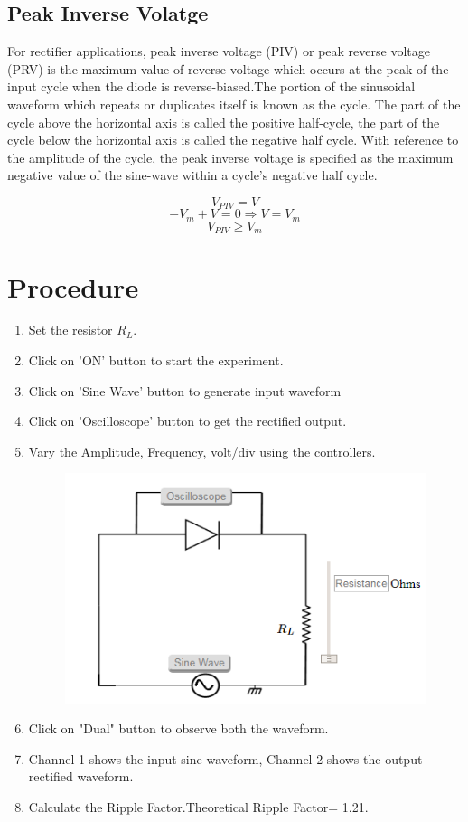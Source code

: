 		\subsection{Peak Inverse Volatge}
			For rectifier applications, peak inverse voltage (PIV) or peak reverse voltage (PRV) is the maximum value of reverse voltage which occurs at the peak of the input cycle when the diode is reverse-biased.The portion of the sinusoidal waveform which repeats or duplicates itself is known as the cycle. The part of the cycle above the horizontal axis is called the positive half-cycle, the part of the cycle below the horizontal axis is called the negative half cycle. With reference to the amplitude of the cycle, the peak inverse voltage is specified as the maximum negative value of the sine-wave within a cycle's negative half cycle.
							
			
			$$ V_{PIV}=V$$
			$$ -V_m +V=0 \Rightarrow V=V_m$$
			$$ V_{PIV} \geq V_m$$
	
	\section{Procedure}
		\begin{enumerate}
			\tightlist
			\item Set the resistor $R_L$.
			\item Click on 'ON' button to start the experiment.
			\item Click on 'Sine Wave' button to generate input waveform
			\item Click on 'Oscilloscope' button to get the rectified output.
			\item Vary the Amplitude, Frequency, volt/div using the controllers.
			\begin{figure}[h]
				\centering
				\includegraphics[width=0.7\linewidth]{img/exp6/8}
				\caption{}
				\label{fig:rfhwp}
			\end{figure}
			\item Click on "Dual" button to observe both the waveform.
			\item Channel 1 shows the input sine waveform, Channel 2 shows the output rectified waveform.
			\item Calculate the Ripple Factor.Theoretical Ripple Factor= 1.21.
		\end{enumerate}
	
